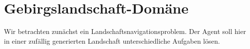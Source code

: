 \chapter{Gebirgslandschaft-Domäne}\label{sec:NavigationProblem}
Wir betrachten zunächst ein Landschaftsnavigationsproblem. Der Agent soll hier in einer zufällig generierten Landschaft unterschiedliche Aufgaben lösen.





